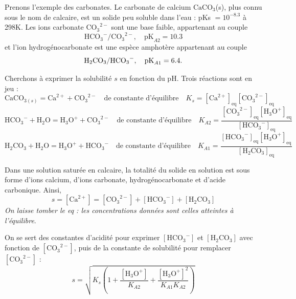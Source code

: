 \documentclass[11pt,a4paper]{report}
\begin{document}
Prenons l'exemple des carbonates. Le carbonate de calcium $\text{CaCO}_3$(s), plus connu sous le nom de calcaire, est un solide peu soluble dans l'eau : pKs $= 10^{-8.3}$ à 298K. Les ions carbonate ${\text{CO}_3}^{2-}$ sont une base faible, appartenant au couple
\begin{equation}
	{\text{HCO}_3}^-/{\text{CO}_3}^{2-},\quad\text{pK}_{A2} = 10.3
\end{equation}
et l'ion hydrogénocarbonate est une espèce amphotère appartenant au couple
\begin{equation}
	{\text{H}_2\text{CO}_3}/{\text{HCO}_3}^-,\quad\text{pK}_{A1} = 6.4.\\
\end{equation}

Cherchons à exprimer la solubilité $s$ en fonction du pH. Trois réactions sont en jeu :
\begin{equation}
	\text{CaCO}_{3(s)} = \text{Ca}^{2+} + {\text{CO}_3}^{2-}
	\quad\text{de constante d'équilibre}\quad
	K_s = [\text{Ca}^{2+}]_\text{eq}[{\text{CO}_3}^{2-}]_\text{eq}
\end{equation}
\begin{equation}
	{\text{HCO}_3}^- + \text{H}_2\text{O} = \text{H}_3\text{O}^+ + {\text{CO}_3}^{2-}
	\quad\text{de constante d'équilibre}\quad
	K_{A2} = \frac{[{\text{CO}_3}^{2-}]_\text{eq}[\text{H}_3\text{O}^+]_\text{eq}}
	{[{\text{HCO}_3}^-]_\text{eq}}
\end{equation}
\begin{equation}
	{\text{H}_2\text{CO}_3} + \text{H}_2\text{O} = \text{H}_3\text{O}^+ + {\text{HCO}_3}^-
	\quad\text{de constante d'équilibre}\quad
	K_{A1} = \frac{[{\text{HCO}_3}^-]_\text{eq}[\text{H}_3\text{O}^+]_\text{eq}}
	{[{\text{H}_2\text{CO}_3}]_\text{eq}}
\end{equation}

Dans une solution saturée en calcaire, la totalité du solide en solution est sous forme d'ions calcium, d'ions carbonate, hydrogénocarbonate et d'acide carbonique. Ainsi,
\begin{equation}
	s = [\text{Ca}^{2+}] = [{\text{CO}_3}^{2-}] + [{\text{HCO}_3}^-] + [{\text{H}_2\text{CO}_3}]
\end{equation}
\textit{On laisse tomber le eq : les concentrations données sont celles atteintes à l'équilibre}.

On se sert des constantes d'acidité pour exprimer $[{\text{HCO}_3}^-]$ et $[{\text{H}_2\text{CO}_3}]$ avec fonction de $[{\text{CO}_3}^{2-}]$, puis de la constante de solubilité pour remplacer $[{\text{CO}_3}^{2-}]$ :
\begin{equation}
	s = \sqrt{K_s\left(1 + \frac{[\text{H}_3\text{O}^+]}{K_{A2}} + \frac{[\text{H}_3\text{O}^+]^2}{K_{A1}K_{A2}}\right)}
\end{equation}
\end{document}
